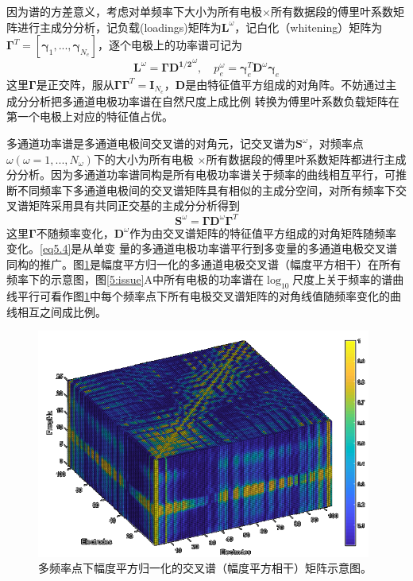 因为谱的方差意义，考虑对单频率下大小为所有电极$\times$所有数据段的傅里叶系数矩阵进行主成分分析，记负载(loadings)矩阵为$\mathbf{L}^\omega$，记白化（whitening）矩阵为$\mathbf{\Gamma}^T=[\mathbf{\gamma}_1,...,\mathbf{\gamma}_{N_e}]$，逐个电极上的功率谱可记为
\begin{equation}\label{eq5.3}
\mathbf{L}^\omega=\mathbf{\Gamma}\mathbf{D^{1/2}}^\omega,\quad{p}_e^\omega=\mathbf{\gamma}_e^T\mathbf{D}^\omega\mathbf{\gamma}_e
\end{equation}
这里$\mathbf{\Gamma}$是正交阵，服从$\mathbf{\Gamma}\mathbf{\Gamma}^T=\mathbf{I}_{N_e}$，$\mathbf{D}$是由特征值平方组成的对角阵。不妨通过主成分分析把多通道电极功率谱在自然尺度上成比例
转换为傅里叶系数负载矩阵在第一个电极上对应的特征值占优。

多通道功率谱是多通道电极间交叉谱的对角元，记交叉谱为$\mathbf{S}^\omega$，对频率点$\omega(\omega=1,...,N_\omega)$下的大小为所有电极
$\times$所有数据段的傅里叶系数矩阵都进行主成分分析。因为多通道功率谱同构是所有电极功率谱关于频率的曲线相互平行，可推断不同频率下多通道电极间的交叉谱矩阵具有相似的主成分空间，对所有频率下交叉谱矩阵采用具有共同正交基的主成分分析得到
\begin{equation}\label{eq5.4}
\mathbf{S}^\omega=\mathbf{\Gamma}\mathbf{D}^\omega\mathbf{\Gamma}^T
\end{equation}
这里$\mathbf{\Gamma}$不随频率变化，$\mathbf{D}^\omega$作为由交叉谱矩阵的特征值平方组成的对角矩阵随频率变化。\eqref{eq5.4}是从单变
量的多通道电极功率谱平行到多变量的多通道电极交叉谱同构的推广。图\ref{5:tensor}是幅度平方归一化的多通道电极交叉谱（幅度平方相干）在所有频率下的示意图，图\ref{5:issue}A中所有电极的功率谱在$\log_{10}$尺度上关于频率的谱曲线平行可看作图\ref{5:tensor}中每个频率点下所有电极交叉谱矩阵的对角线值随频率变化的曲线相互之间成比例。
\begin{figure}[!h]
\includegraphics[width=11cm]{pic/palos/spectratensor.png}
\caption{多频率点下幅度平方归一化的交叉谱（幅度平方相干）矩阵示意图。}
\label{5:tensor}
\end{figure}

